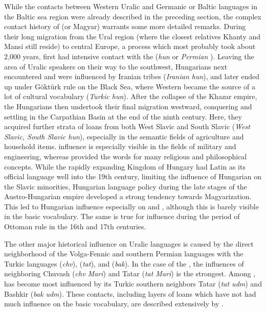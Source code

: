 While the contacts between Western Uralic and Germanic or Baltic languages in the Baltic sea region were already described in the preceding section, the complex contact history of  (or Magyar) warrants some more detailed remarks. During their long migration from the Ural region (where the closest relatives Khanty and Mansi still reside) to central Europe, a process which most probably took about 2,000 years,  first had intensive contact with the  (\textit{hun}  or \textit{Permian} ). Leaving the area of Uralic speakers on their way to the southwest, Hungarians next encountered and were influenced by Iranian tribes (\textit{Iranian \arrowLA hun}), and later ended up under G\"oktürk rule on the Black Sea, where Western  became the source of a lot of cultural vocabulary (\textit{Turkic \arrowLA hun}). After the collapse of the Khazar empire, the Hungarians then undertook their final migration westward, conquering and settling in the Carpathian Basin at the end of the ninth century. Here, they acquired further strata of loans from both West Slavic and South Slavic (\textit{West Slavic, South Slavic \arrowLA hun}), especially in the semantic fields of agriculture and household items.  influence is especially visible in the fields of military and engineering, whereas  provided the words for many religious and philosophical concepts. While the rapidly expanding Kingdom of Hungary had Latin as its official language well into the 19th century, limiting the influence of Hungarian on the Slavic minorities, Hungarian language policy during the late stages of the Austro-Hungarian empire developed a strong tendency towards Magyarization. This led to Hungarian influence especially on  and , although this is barely visible in the basic vocabulary. The same is true for  influence during the period of Ottoman rule in the 16th and 17th centuries.

The other major historical influence on Uralic languages is caused by the direct neighborhood of the Volga-Fennic and southern Permian languages with the Turkic languages  (\textit{chv}),  (\textit{tat}), and  (\textit{bak}). In the case of the , the influences of neighboring Chuvash (\textit{chv \arrowLA Mari}) and Tatar (\textit{tat \arrowLA Mari}) is the strongest. Among ,  has become most influenced by its Turkic southern neighbors Tatar (\textit{tat \arrowLA udm}) and Bashkir (\textit{bak \arrowLA udm}). These contacts, including layers of loans which have not had much influence on the basic vocabulary, are described extensively by \cite{rona-tas1988}.

